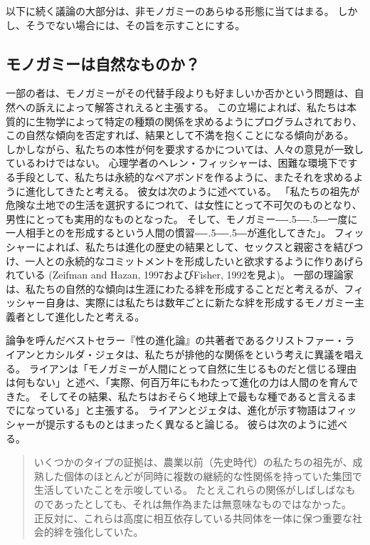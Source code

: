 \documentclass[paper=a4,book,openany]{jlreq}
\def\DDASH{―\kern-.5\zw―\kern-.5\zw―} %
\begin{document}
以下に続く議論の大部分は、非モノガミーのあらゆる形態に当てはまる。
しかし、そうでない場合には、その旨を示すことにする。

\subsection{モノガミーは自然なものか？}

一部の者は、モノガミーがその代替手段よりも好ましいか否かという問題は、自然への訴えによって解答されえると主張する。
この立場によれば、私たちは本質的に生物学によって特定の種類の関係を求めるようにプログラムされており、この自然な傾向を否定すれば、結果として不満を抱くことになる傾向がある。
しかしながら、私たちの本性が何を要求するかについては、人々の意見が一致しているわけではない。
心理学者のヘレン・フィッシャーは、困難な環境下でする手段として、私たちは永続的なペアボンドを作るように、またそれを求めるように進化してきたと考える。
彼女は次のように述べている。
「私たちの祖先が危険な土地での生活を選択するにつれて、は女性にとって不可欠のものとなり、男性にとっても実用的なものとなった。
そして、モノガミー{\DDASH}一度に一人相手とのを形成するという人間の慣習{\DDASH}が進化してきた」\citep[p.131]{fisher04:_why_we_love}。
フィッシャーによれば、私たちは進化の歴史の結果として、セックスと親密さを結びつけ、一人との永続的なコミットメントを形成したいと欲求するように作りあげられている
(Zeifman and Hazan, 1997およびFisher, 1992を見よ)。
\nocite{zeifman97:_proces_model_adult_attac_format}\nocite{fisher92:_anatom_love}
一部の理論家は、私たちの自然的な傾向は生涯にわたる絆を形成することだと考えるが、フィッシャー自身は、実際には私たちは数年ごとに新たな絆を形成するモノガミー主義者として進化したと考える。

論争を呼んだベストセラー『性の進化論』\citep{ryan10:_sex_dawn}の共著者であるクリストファー・ライアンとカシルダ・ジェタは、私たちが排他的な関係をという考えに異議を唱える。
ライアンは「モノガミーが人間にとって自然に生じるものだと信じる理由は何もない」と述べ、「実際、何百万年にもわたって進化の力は人間のを育んできた。
そしてその結果、私たちはおそらく地球上で最もな種であると言えるまでになっている」と主張する\citep{ryan10:_monog_unnat_our_sexy_species}。
ライアンとジェタは、進化が示す物語はフィッシャーが提示するものとはまったく異なると論じる。
彼らは次のように述べる。

\begin{quote}

いくつかのタイプの証拠は、農業以前（先史時代）の私たちの祖先が、成熟した個体のほとんどが同時に複数の継続的な性関係を持っていた集団で生活していたことを示唆している。
たとえこれらの関係がしばしばなものであったとしても、それは無作為または無意味なものではなかった。
正反対に、これらは高度に相互依存している共同体を一体に保つ重要な社会的絆を強化していた。
\citep[pp.9--10]{ryan10:_sex_dawn}
\end{quote}
\end{document}
